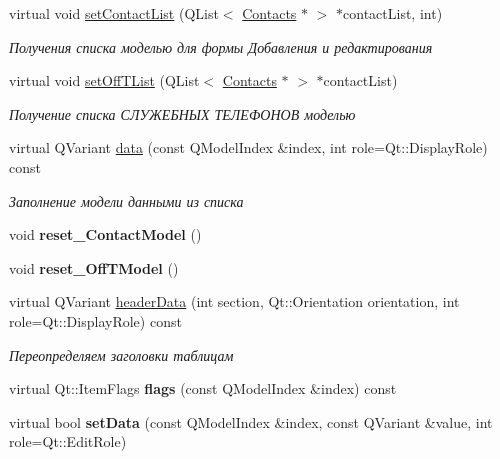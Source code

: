 \begin{DoxyCompactItemize}
virtual void \mbox{\hyperlink{class_m_t_m___contacts_a4c499bb4c0f63f2c12973859b2f70471}{set\+Contact\+List}} (Q\+List$<$ \mbox{\hyperlink{class_contacts}{Contacts}} $\ast$ $>$ $\ast$contact\+List, int)
\begin{DoxyCompactList}\small\item\em Получения списка моделью для формы Добавления и редактирования \end{DoxyCompactList}\item 
\mbox{\label{class_m_t_m___contacts_aff261a87ae54d3c9efe19de0c4bc98e7}} 
virtual void \mbox{\hyperlink{class_m_t_m___contacts_aff261a87ae54d3c9efe19de0c4bc98e7}{set\+Off\+T\+List}} (Q\+List$<$ \mbox{\hyperlink{class_contacts}{Contacts}} $\ast$ $>$ $\ast$contact\+List)
\begin{DoxyCompactList}\small\item\em Получение списка СЛУЖЕБНЫХ ТЕЛЕФОНОВ моделью \end{DoxyCompactList}\item 
\mbox{\label{class_m_t_m___contacts_ace619d3d9ab354d1fccd80036bb7ac85}} 
virtual Q\+Variant \mbox{\hyperlink{class_m_t_m___contacts_ace619d3d9ab354d1fccd80036bb7ac85}{data}} (const Q\+Model\+Index \&index, int role=Qt\+::\+Display\+Role) const
\begin{DoxyCompactList}\small\item\em Заполнение модели данными из списка \end{DoxyCompactList}\item 
\mbox{\label{class_m_t_m___contacts_acc5adea054b4b10205287c77c24734ca}} 
void {\bfseries reset\+\_\+\+Contact\+Model} ()
\item 
\mbox{\label{class_m_t_m___contacts_a5ac56a769f84936a08adabd29974300b}} 
void {\bfseries reset\+\_\+\+Off\+T\+Model} ()
\item 
\mbox{\label{class_m_t_m___contacts_a7ee9cbc282a02ab4cebf8ee97188b341}} 
virtual Q\+Variant \mbox{\hyperlink{class_m_t_m___contacts_a7ee9cbc282a02ab4cebf8ee97188b341}{header\+Data}} (int section, Qt\+::\+Orientation orientation, int role=Qt\+::\+Display\+Role) const
\begin{DoxyCompactList}\small\item\em Переопределяем заголовки таблицам \end{DoxyCompactList}\item 
\mbox{\label{class_m_t_m___contacts_a36717c8fcf37aef4141e1b5788a04845}} 
virtual Qt\+::\+Item\+Flags {\bfseries flags} (const Q\+Model\+Index \&index) const
\item 
\mbox{\label{class_m_t_m___contacts_a94708f2f3f4d4e2f1ad33a81375b43b0}} 
virtual bool {\bfseries set\+Data} (const Q\+Model\+Index \&index, const Q\+Variant \&value, int role=Qt\+::\+Edit\+Role)
\end{DoxyCompactItemize}
